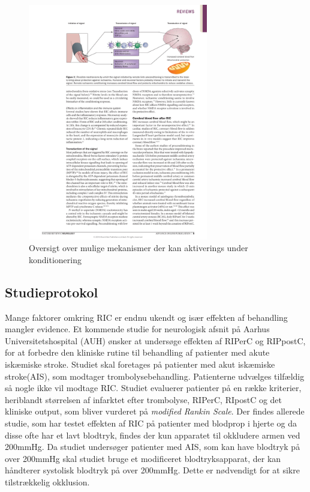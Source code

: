 \begin{figure}[H]
	\centering
	\includegraphics[width = 0.7\textwidth]{billeder/Konditioneringsmekanismer.pdf}
	\caption{Oversigt over mulige mekanismer der kan aktiverings under konditionering} \label{fig:mechanism}
\end{figure}

\subsection{Studieprotokol}

Mange faktorer omkring RIC er endnu ukendt og især effekten af behandling mangler evidence. Et kommende studie for neurologisk afsnit på Aarhus Universitetshospital (AUH) ønsker at undersøge effekten af RIPerC og RIPpostC, for at forbedre den kliniske rutine til behandling af patienter med akute iskæmiske stroke.  Studiet skal foretages på patienter med akut iskæmiske stroke(AIS), som modtager trombolysebehandling. Patienterne udvælges tilfældig så nogle ikke vil modtage RIC. Studiet evaluerer patienter på en række kriterier, heriblandt størrelsen af infarktet efter trombolyse, RIPerC, RIpostC og det kliniske output, som bliver vurderet på \textit{modified Rankin Scale}. Der findes allerede studie, som har testet effekten af RIC på patienter med blodprop i hjerte og da disse ofte har et lavt blodtryk, findes der kun apparatet til okkludere armen ved 200mmHg. Da studiet undersøger patienter med AIS, som kan have blodtryk på over 200mmHg skal studiet bruge et modificeret blodtryksapparat, der kan håndterer systolisk blodtryk på over 200mmHg. Dette er nødvendigt for at sikre tilstrækkelig okklusion.

